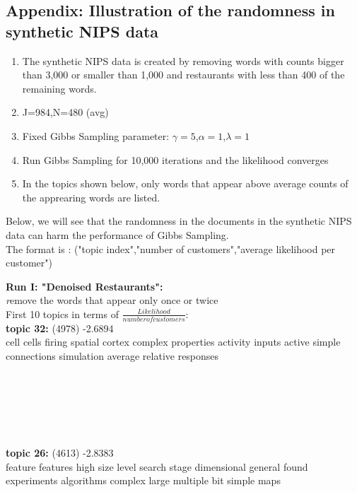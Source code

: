 \documentclass{article}
\begin{document}
\begin{spacing}{1.1}
\section{Appendix: Illustration of the randomness in synthetic NIPS data}
\begin{enumerate}
 \item The synthetic NIPS data is created by removing words with counts bigger than 3,000
or smaller than 1,000 and restaurants with less than 400 of the remaining words.
 \item J=984,N=480 (avg)
 \item Fixed Gibbs Sampling parameter: $\gamma=5$,$\alpha=1$,$\lambda=1$
 \item Run Gibbs Sampling for 10,000 iterations and the likelihood converges
 \item In the topics shown below, only words that appear above average counts of the apprearing words are listed. 
\end{enumerate}
Below, we will see that the randomness in the documents in the synthetic NIPS data
can harm the performance of Gibbs Sampling.\\
The format is : ("topic index","number of customers","average likelihood per customer")
\begin{table}[ht]
\begin{minipage}[b]{0.5\linewidth}
{\bf Run I: "Denoised Restaurants":}\\
{\emph remove the words that appear only once or twice}\\
First 10 topics in terms of $\frac{Likelihood}{number of customers}$:\\
{\bf topic 32:} (4978)  -2.6894\\
cell cells firing spatial cortex complex properties activity inputs active simple connections simulation average relative responses \\\\\\\\\\\\\\
{\bf topic 26:} (4613)  -2.8383\\
feature features high size level search stage dimensional general found experiments algorithms complex large multiple bit simple maps \\\\\\\\\\\\\\

\end{minipage}
\end{table}
\end{spacing}
\end{document}
